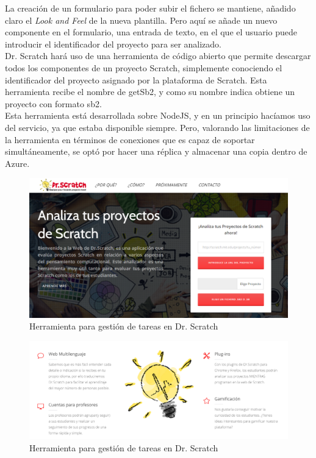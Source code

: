 \documentclass[a4paper, 12pt]{book}
\begin{document}
La creación de un formulario para poder subir el fichero se mantiene, añadido claro
el \emph{Look and Feel} de la nueva plantilla. Pero aquí se añade un nuevo componente
en el formulario, una entrada de texto, en el que el usuario puede introducir el 
identificador del proyecto para ser analizado. \\

Dr. Scratch hará uso de una herramienta de código abierto que permite descargar todos
los componentes de un proyecto Scratch, simplemente conociendo el identificador del
proyecto asignado por la plataforma de Scratch. Esta herramienta recibe el nombre de
getSb2, y como su nombre indica obtiene un proyecto con formato sb2. \\

Esta herramienta está desarrollada sobre NodeJS, y en un principio hacíamos uso del
servicio, ya que estaba disponible siempre. Pero, valorando las limitaciones
de la herramienta en términos de conexiones que es capaz de soportar simultáneamente, 
se optó por hacer una réplica y almacenar una copia dentro de Azure.


\begin{figure}
	\graphicspath{{img/}}
  \includegraphics[bb=0 0 800 600, width=12cm, keepaspectratio]{drscratchactual.png}
	\caption{Herramienta para gestión de tareas en Dr. Scratch}
  \label{figura:foro_hilos}
\end{figure}

\begin{figure}
	\graphicspath{{img/}}
  \includegraphics[bb=0 0 800 600, width=12cm, keepaspectratio]{nuevasfuncionalidades.png}
	\caption{Herramienta para gestión de tareas en Dr. Scratch}
  \label{figura:foro_hilos}
\end{figure}
\end{document}
